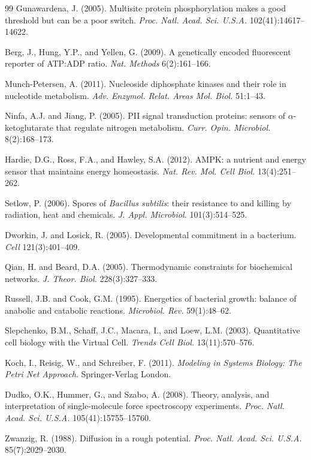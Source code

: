 \documentclass[twocolumn,11pt]{article}
\begin{document}
\begin{thebibliography}{99}
Gunawardena, J. (2005).
\newblock Multisite protein phosphorylation makes a good threshold but can be a poor switch.
\newblock \textit{Proc. Natl. Acad. Sci. U.S.A.} 102(41):14617--14622.

Berg, J., Hung, Y.P., and Yellen, G. (2009).
\newblock A genetically encoded fluorescent reporter of ATP:ADP ratio.
\newblock \textit{Nat. Methods} 6(2):161--166.

Munch-Petersen, A. (2011).
\newblock Nucleoside diphosphate kinases and their role in nucleotide metabolism.
\newblock \textit{Adv. Enzymol. Relat. Areas Mol. Biol.} 51:1--43.

Ninfa, A.J. and Jiang, P. (2005).
\newblock PII signal transduction proteins: sensors of $\alpha$-ketoglutarate that regulate nitrogen metabolism.
\newblock \textit{Curr. Opin. Microbiol.} 8(2):168--173.

Hardie, D.G., Ross, F.A., and Hawley, S.A. (2012).
\newblock AMPK: a nutrient and energy sensor that maintains energy homeostasis.
\newblock \textit{Nat. Rev. Mol. Cell Biol.} 13(4):251--262.

Setlow, P. (2006).
\newblock Spores of \textit{Bacillus subtilis}: their resistance to and killing by radiation, heat and chemicals.
\newblock \textit{J. Appl. Microbiol.} 101(3):514--525.

Dworkin, J. and Losick, R. (2005).
\newblock Developmental commitment in a bacterium.
\newblock \textit{Cell} 121(3):401--409.

Qian, H. and Beard, D.A. (2005).
\newblock Thermodynamic constraints for biochemical networks.
\newblock \textit{J. Theor. Biol.} 228(3):327--333.

Russell, J.B. and Cook, G.M. (1995).
\newblock Energetics of bacterial growth: balance of anabolic and catabolic reactions.
\newblock \textit{Microbiol. Rev.} 59(1):48--62.

Slepchenko, B.M., Schaff, J.C., Macara, I., and Loew, L.M. (2003).
\newblock Quantitative cell biology with the Virtual Cell.
\newblock \textit{Trends Cell Biol.} 13(11):570--576.

Koch, I., Reisig, W., and Schreiber, F. (2011).
\newblock \textit{Modeling in Systems Biology: The Petri Net Approach}.
\newblock Springer-Verlag London.

Dudko, O.K., Hummer, G., and Szabo, A. (2008).
\newblock Theory, analysis, and interpretation of single-molecule force spectroscopy experiments.
\newblock \textit{Proc. Natl. Acad. Sci. U.S.A.} 105(41):15755--15760.

Zwanzig, R. (1988).
\newblock Diffusion in a rough potential.
\newblock \textit{Proc. Natl. Acad. Sci. U.S.A.} 85(7):2029--2030.

\end{thebibliography}
\end{document}
